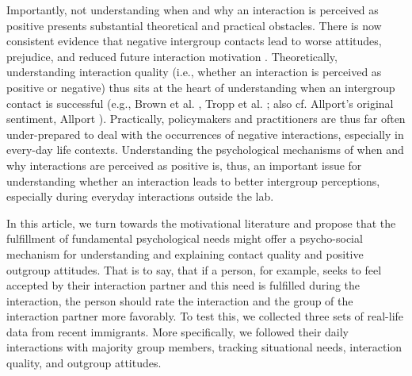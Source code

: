 \documentclass[man, 12pt, a4paper, mask]{apa7}
\theoremstyle{break}
\theoremstyle{plain}
\begin{document}
Importantly, not understanding when and why an interaction is perceived as positive presents substantial theoretical and practical obstacles. There is now consistent evidence that negative intergroup contacts lead to worse attitudes, prejudice, and reduced future interaction motivation \citep[e.g.,][]{Barlow2012, Prati2021, Graf2014}. Theoretically, understanding interaction quality (i.e., whether an interaction is perceived as positive or negative) thus sits at the heart of understanding when an intergroup contact is successful (e.g., Brown et al. \citeyear{Brown2007}, Tropp et al. \citeyear{Tropp2016}; also cf. Allport’s original sentiment, Allport \citeyear{Allport1954b}). Practically, policymakers and practitioners are thus far often under-prepared to deal with the occurrences of negative interactions, especially in every-day life contexts. Understanding the psychological mechanisms of when and why interactions are perceived as positive is, thus, an important issue for understanding whether an interaction leads to better intergroup perceptions, especially during everyday interactions outside the lab.

In this article, we turn towards the motivational literature and propose that the fulfillment of fundamental psychological needs might offer a psycho-social mechanism for understanding and explaining contact quality and positive outgroup attitudes. That is to say, that if a person, for example, seeks to feel accepted by their interaction partner and this need is fulfilled during the interaction, the person should rate the interaction and the group of the interaction partner more favorably. To test this, we collected three sets of real-life data from recent immigrants. More specifically, we followed their daily interactions with majority group members, tracking situational needs, interaction quality, and outgroup attitudes. 
\end{document}
